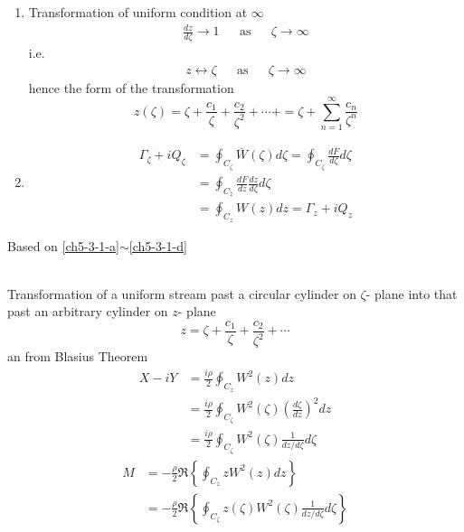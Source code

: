 \begin{itemize}
\begin{enumerate}[label = (\alph*)]
\begin{equation}
\end{equation}
$\tilde{W}(\zeta)\to\infty$ at the critical point $\displaystyle\frac{d\zeta}{dz} = 0$
\item Transformation of uniform condition at $\infty$
\begin{align*}
\frac{dz}{d\zeta}\to 1 &&\text{as}&&\zeta\to\infty
\end{align*}
i.e.
\begin{align*}
z\longleftrightarrow\zeta &&\text{as}&&\zeta\to\infty
\end{align*}
hence the form of the transformation
\[
z(\zeta) = \zeta + \frac{c_1}{\zeta} + \frac{c_2}{\zeta^2} + \cdots + = \zeta + \sum_{n=1}^\infty\frac{c_n}{\zeta^n}
\]
\item \label{ch5-3-1-d}
\begin{align*}
\Gamma_\zeta + iQ_\zeta
&= \oint_{C_\zeta}\overline{W}(\zeta)d\zeta = \oint_{C_\zeta}\frac{d\overline{F}}{d\zeta}d\zeta \\
&= \oint_{C_z}\frac{dF}{dz}\frac{dz}{d\zeta}d\zeta \\
&= \oint_{C_z}W(z)dz = \Gamma_z + iQ_z
\end{align*}
\end{enumerate}
Based on \ref{ch5-3-1-a}$\sim$\ref{ch5-3-1-d}
\begin{example}\mbox{}\\
Transformation of a uniform stream past a circular cylinder on $\zeta$- plane into that past an arbitrary cylinder on $z$- plane
\begin{equation}
z = \zeta + \frac{c_1}{\zeta} + \frac{c_2}{\zeta^2} + \cdots
\label{eq: 5-3-4}
\end{equation}
an from Blasius Theorem
\begin{equation}
\begin{aligned}
X - iY
&= \frac{i\rho}{2}\oint_{C_z}W^2(z)dz \\
&= \frac{i\rho}{2}\oint_{C_\zeta}W^2(\zeta)\left(\frac{d\zeta}{dz}\right)^2dz \\
&= \frac{i\rho}{2}\oint_{C_\zeta}W^2(\zeta)\frac{1}{dz/d\zeta}d\zeta
\end{aligned}
\label{eq: 5-3-5}
\end{equation}
\begin{equation}
\begin{aligned}
M
&= -\frac{\rho}{2}\Re\left\{\oint_{C_z}zW^2(z)dz\right\} \\
&= -\frac{\rho}{2}\Re\left\{\oint_{C_\zeta}z(\zeta)W^2(\zeta)\frac{1}{dz/d\zeta}d\zeta\right\}
\end{aligned}
\label{eq: 5-3-6}
\end{equation}
\end{example}
\end{itemize}
